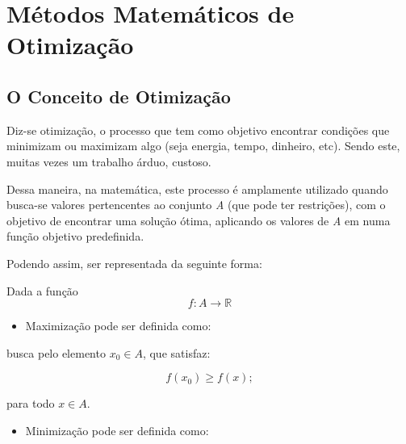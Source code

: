 

\chapter{\Large{Métodos Matemáticos de Otimização}}\label{chp:1}


\section{{O Conceito de Otimização}}

\hspace{0.8cm}
Diz-se otimização, o processo que tem como objetivo encontrar condições que
minimizam ou maximizam algo (seja energia, tempo, dinheiro, etc). Sendo este,
muitas vezes um trabalho árduo, custoso.

Dessa maneira, na matemática, este processo é amplamente utilizado quando
busca-se valores pertencentes ao conjunto \textit{A} (que pode ter
restrições), com o objetivo de encontrar uma solução ótima, aplicando os valores
de \textit{A} em numa função objetivo predefinida.

Podendo assim, ser representada da seguinte forma:

    Dada a função
        \begin{equation}
            f : A \rightarrow \mathbb{R}
        \end{equation}

        \begin{itemize}
                \item Maximização pode ser definida como:
        \end{itemize}

                busca pelo elemento \(x_0 \in A\), que satisfaz:

                    \begin{equation}
                        f(x_0) \geq f(x);
                    \end{equation}

                para todo \(x \in A\).

        \begin{itemize}
                \item Minimização pode ser definida como:
        \end{itemize}

